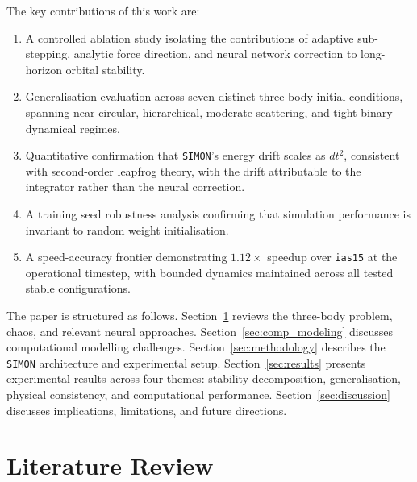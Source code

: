\documentclass[12pt]{article}
\begin{document}
The key contributions of this work are:

\begin{enumerate}
  \item A controlled ablation study isolating the contributions of adaptive
        sub-stepping, analytic force direction, and neural network correction to
        long-horizon orbital stability.
  \item Generalisation evaluation across seven distinct three-body initial conditions,
        spanning near-circular, hierarchical, moderate scattering, and tight-binary
        dynamical regimes.
  \item Quantitative confirmation that \texttt{SIMON}'s energy drift scales as
        $dt^2$, consistent with second-order leapfrog theory, with the drift
        attributable to the integrator rather than the neural correction.
  \item A training seed robustness analysis confirming that simulation performance
        is invariant to random weight initialisation.
  \item A speed-accuracy frontier demonstrating $1.12\times$ speedup over
        \texttt{ias15} at the operational timestep, with bounded dynamics maintained
        across all tested stable configurations.
\end{enumerate}

The paper is structured as follows.
Section~\ref{sec:lit_review} reviews the three-body problem, chaos, and relevant
neural approaches.
Section~\ref{sec:comp_modeling} discusses computational modelling challenges.
Section~\ref{sec:methodology} describes the \texttt{SIMON} architecture and
experimental setup.
Section~\ref{sec:results} presents experimental results across four themes:
stability decomposition, generalisation, physical consistency, and computational
performance.
Section~\ref{sec:discussion} discusses implications, limitations, and future
directions.

\section{Literature Review}
\label{sec:lit_review}
\end{document}
